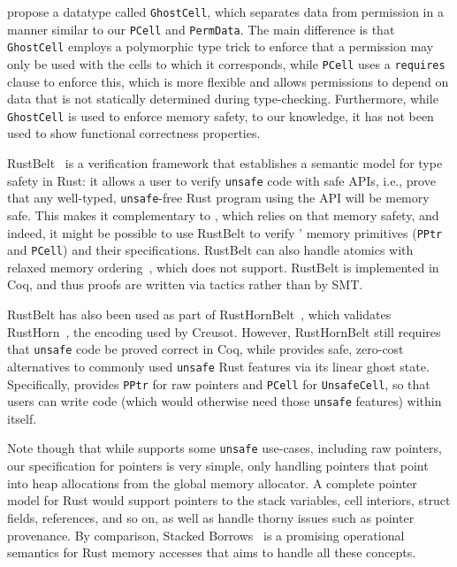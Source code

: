 

\citet{DBLP:journals/pacmpl/YanovskiDJD21} propose a datatype called \verb`GhostCell`, which separates
data from permission in a manner similar to our \verb`PCell` and \verb`PermData`.
The main difference is that \verb`GhostCell` employs a polymorphic type trick to enforce that a permission may
only be used with the cells to which it corresponds, while \verb`PCell` uses a \verb`requires` clause to enforce this,
which is more flexible and allows permissions to depend on data that is not statically determined during type-checking.
Furthermore, while \verb`GhostCell` is used to enforce memory safety, to our knowledge, it has not been used to show functional correctness properties.

RustBelt~\cite{DBLP:journals/pacmpl/0002JKD18} is a verification framework that establishes
a semantic model for type safety in Rust: it allows a user to verify \verb`unsafe` code
with safe APIs, i.e., prove that any well-typed, \verb`unsafe`-free Rust program using the API
will be memory safe.
This makes it complementary to \verus, which relies on that memory safety, and indeed, it might be possible to use RustBelt to verify \verus' memory primitives (\verb`PPtr` and \verb`PCell`) and their specifications.
RustBelt can also handle atomics with relaxed memory ordering~\cite{DBLP:journals/pacmpl/DangJKD20}, which \verus does not support.
RustBelt is implemented in Coq, and thus proofs are written via tactics rather than by SMT.

RustBelt has also been used as part of RustHornBelt~\cite{DBLP:conf/pldi/MatsushitaDJD22}, which validates RustHorn~\cite{DBLP:conf/esop/0002T020},
the encoding used by Creusot.
However, RustHornBelt still requires that \verb`unsafe` code be proved correct in Coq,
while \verus provides safe, zero-cost alternatives to commonly used \verb`unsafe` Rust features via its linear ghost state.
Specifically, \verus provides \verb`PPtr` for raw pointers and \verb`PCell` for \verb`UnsafeCell`, so that users can write code (which would otherwise need those
\verb`unsafe` features) within \verus itself.

Note though that while \verus supports some \verb`unsafe` use-cases, including raw pointers,
our specification for pointers
is very simple, only handling pointers that point into heap allocations from the global
memory allocator. A complete pointer model for Rust would support pointers to the
stack variables, cell interiors, struct fields, references, and so on, as well as handle
thorny issues such as pointer provenance.
By comparison, Stacked Borrows~\cite{StackedBorrows} is a promising operational semantics 
for Rust memory accesses that aims to handle all these concepts.

